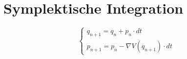 \section{Symplektische Integration}
\[
\begin{cases}
q_{n+1} = q_n + p_n \cdot dt \\
p_{n+1} = p_n - \nabla V(q_{n+1}) \cdot dt
\end{cases}
\]